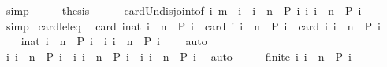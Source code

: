 \begin{isabellebody}
\ simp\isanewline
\ \ \isamarkupfalse%
\ \isamarkupfalse%
\ {\isacharquery}thesis\isanewline
\ \ \ \ \isamarkupfalse%
\ card{\isacharunderscore}Un{\isacharunderscore}disjoint{\isacharbrackleft}of\ {\isacartoucheopen}{\isacharbraceleft}i{\isachardot}\ m\ {\isacharless}\ i\ {\isasymand}\ i\ {\isacharless}\ n\ {\isasymand}\ P\ i{\isacharbraceright}{\isacartoucheclose}\ {\isacartoucheopen}{\isacharbraceleft}i{\isachardot}\ i\ {\isacharequal}\ n\ {\isasymand}\ P\ i{\isacharbraceright}{\isacartoucheclose}{\isacharbrackright}\ \isamarkupfalse%
\ simp\isanewline
{}\isamarkupfalse%
%
\endisatagproof
{\isafoldproof}%
%
\isadelimproof
\isanewline
%
\endisadelimproof
\isanewline
{}\isamarkupfalse%
\ card{\isacharunderscore}le{\isacharunderscore}leq{\isacharunderscore}{}{\isacharcolon}\isanewline
\ \ {\isacartoucheopen}card\ {\isacharbraceleft}i{\isacharcolon}{\isacharcolon}nat{\isachardot}\ i\ {\isasymle}\ n\ {\isasymand}\ P\ i{\isacharbraceright}\ {\isacharequal}\ card\ {\isacharbraceleft}i{\isachardot}\ i\ {\isacharless}\ n\ {\isasymand}\ P\ i{\isacharbraceright}\ {\isacharplus}\ card\ {\isacharbraceleft}i{\isachardot}\ i\ {\isacharequal}\ n\ {\isasymand}\ P\ i{\isacharbraceright}{\isacartoucheclose}\isanewline
%
\isadelimproof
%
\endisadelimproof
%
\isatagproof
{}\isamarkupfalse%
\ {\isacharminus}\isanewline
\ \ \isamarkupfalse%
\ {\isacartoucheopen}{\isacharbraceleft}i{\isacharcolon}{\isacharcolon}nat{\isachardot}\ i\ {\isacharless}\ n\ {\isasymand}\ P\ i{\isacharbraceright}\ {\isasyminter}\ {\isacharbraceleft}i{\isachardot}\ i\ {\isacharequal}\ n\ {\isasymand}\ P\ i{\isacharbraceright}\ {\isacharequal}\ {\isacharbraceleft}{\isacharbraceright}{\isacartoucheclose}\ \isamarkupfalse%
\ auto\isanewline
\ \ \isamarkupfalse%
\ \isamarkupfalse%
\ {\isacartoucheopen}{\isacharbraceleft}i{\isachardot}\ i\ {\isacharless}\ n\ {\isasymand}\ P\ i{\isacharbraceright}\ {\isasymunion}\ {\isacharbraceleft}i{\isachardot}\ i\ {\isacharequal}\ n\ {\isasymand}\ P\ i{\isacharbraceright}\ {\isacharequal}\ {\isacharbraceleft}i{\isachardot}\ i\ {\isasymle}\ n\ {\isasymand}\ P\ i{\isacharbraceright}{\isacartoucheclose}\ \isamarkupfalse%
\ auto\isanewline
\ \ \isamarkupfalse%
\ \isamarkupfalse%
\ {\isacartoucheopen}finite\ {\isacharbraceleft}i{\isachardot}\ i\ {\isacharless}\ n\ {\isasymand}\ P\ i{\isacharbraceright}{\isacartoucheclose}\ \isamarkupfalse%

\end{isabellebody}
